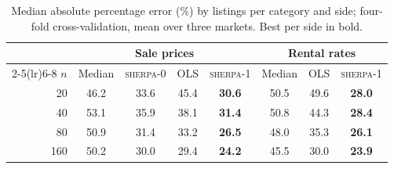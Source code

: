 \begin{table}[t]
\centering\small
\caption{Median absolute percentage error (\%) by listings per category and side; four-fold cross-validation, mean over three markets. Best per side in bold.}
\label{tab:size}
\begin{tabular}{rccccccc}
\toprule
 & \multicolumn{4}{c}{Sale prices} & \multicolumn{3}{c}{Rental rates} \\
\cmidrule(lr){2-5}\cmidrule(lr){6-8}
$n$ & Median & \textsc{sherpa-0} & OLS & \textsc{sherpa-1} & Median & OLS & \textsc{sherpa-1} \\
\midrule
20 & 46.2 & 33.6 & 45.4 & \textbf{30.6} & 50.5 & 49.6 & \textbf{28.0} \\
40 & 53.1 & 35.9 & 38.1 & \textbf{31.4} & 50.8 & 44.3 & \textbf{28.4} \\
80 & 50.9 & 31.4 & 33.2 & \textbf{26.5} & 48.0 & 35.3 & \textbf{26.1} \\
160 & 50.2 & 30.0 & 29.4 & \textbf{24.2} & 45.5 & 30.0 & \textbf{23.9} \\
\bottomrule
\end{tabular}
\end{table}
